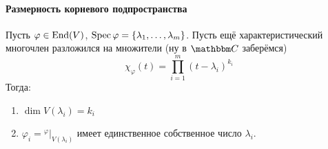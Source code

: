 \documentclass[12pt]{../../../notes}
\begin{document}
\paragraph{Размерность корневого подпространства}

\begin{thrm}\label{thrm:linop::rootdim}
  Пусть $\varphi \in \operatorname{End} (V)$, $\operatorname{Spec} \varphi = \{\lambda_1, \dotsc , \lambda_m\}$.
  Пусть ещё характеристический многочлен разложился на множители (ну в $\C$ заберёмся)
  \[
    \chi_\varphi(t) = \prod_{i=1}^m (t-\lambda_i)^{k_i}
  \]
  Тогда:
  \begin{enumerate}
    \item $\dim V(\lambda_i) = k_i$
    \item $\varphi_i = {}^{\varphi}\big\vert_{V(\lambda_i)}$ имеет единственное собственное число $\lambda_i$.
  \end{enumerate}
\end{thrm}
\end{document}
